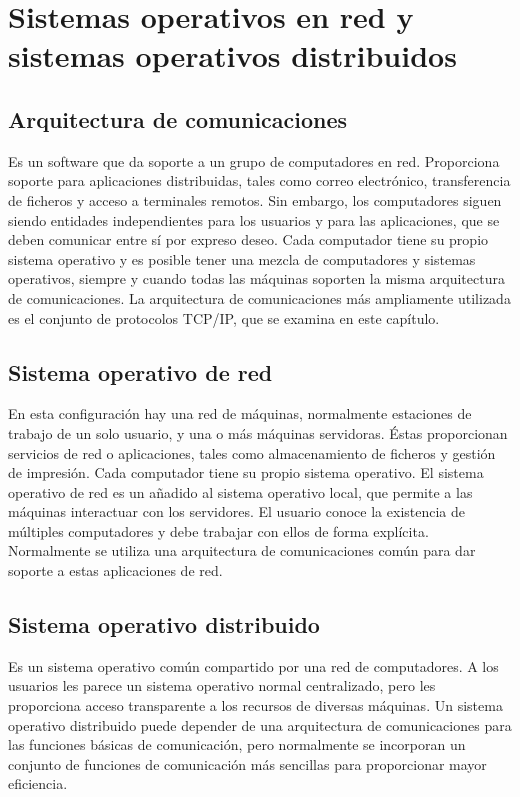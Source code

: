 \documentclass[10pt,a4paper,spanish]{report}
\begin{document}

  \section{Sistemas operativos en red y sistemas operativos distribuidos}

  \subsection{Arquitectura de comunicaciones}

  \noindent
  Es un software que da soporte a un grupo de computadores en red. Proporciona soporte para aplicaciones distribuidas, tales como correo electrónico, transferencia de ficheros y acceso a terminales remotos. Sin embargo, los computadores siguen siendo entidades independientes para los usuarios y para las aplicaciones, que se deben comunicar entre sí por expreso deseo. Cada computador tiene su propio sistema operativo y es posible tener una mezcla de computadores y sistemas operativos, siempre y cuando todas las máquinas soporten la misma arquitectura de comunicaciones. La arquitectura de comunicaciones más ampliamente utilizada es el conjunto de protocolos TCP/IP, que se examina en este capítulo.

  \subsection{Sistema operativo de red}

  \noindent
  En esta configuración hay una red de máquinas, normalmente estaciones de trabajo de un solo usuario, y una o más máquinas servidoras. Éstas proporcionan servicios de red o aplicaciones, tales como almacenamiento de ficheros y gestión de impresión. Cada computador tiene su propio sistema operativo. El sistema operativo de red es un añadido al sistema operativo local, que permite a las máquinas interactuar con los servidores. El usuario conoce la existencia de múltiples computadores y debe trabajar con ellos de forma explícita. Normalmente se utiliza una arquitectura de comunicaciones común para dar soporte a estas aplicaciones de red.

  \subsection{Sistema operativo distribuido}

  \noindent
  Es un sistema operativo común compartido por una red de computadores. A los usuarios les parece un sistema operativo normal centralizado, pero les proporciona acceso transparente a los recursos de diversas máquinas. Un sistema operativo distribuido puede depender de una arquitectura de comunicaciones para las funciones básicas de comunicación, pero normalmente se incorporan un conjunto de funciones de comunicación más sencillas para proporcionar mayor eficiencia.
\end{document}
